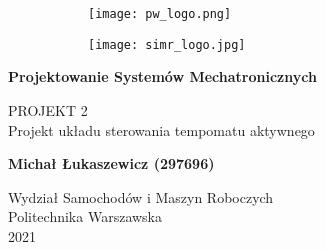 \begin{titlepage}

   \begin{figure}
        \begin{subfigure}{.5\linewidth}    
            \centering
            \texttt{[image: pw\_logo.png]}
        \end{subfigure}
        \begin{subfigure}{.5\linewidth}    
            \centering
            \texttt{[image: simr\_logo.jpg]}
        \end{subfigure}
    \end{figure}

	\begin{center}
		
	\vspace*{0.2\textheight}

	\begin{Large}
	\textbf{Projektowanie Systemów Mechatronicznych}
	\end{Large}

	\vspace{0.5cm}
	
	\begin{large}
		PROJEKT 2\\
		Projekt układu sterowania tempomatu aktywnego
	\end{large}
	
	\vspace{1.5cm}

	\textbf{Michał Łukaszewicz (297696)}

	\vfill

	Wydział Samochodów i Maszyn Roboczych\\
	Politechnika Warszawska\\
	2021
	
		
	\end{center}
\end{titlepage}